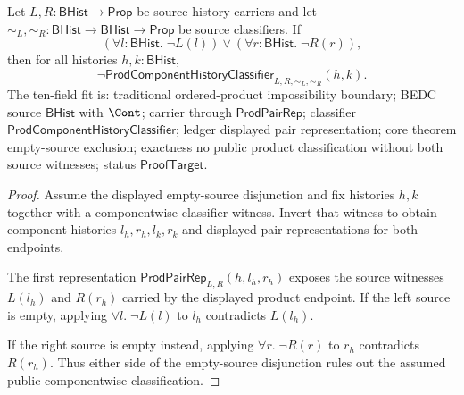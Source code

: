 \begin{theorem}
\label{thm:prod-component-history-classifier-empty-source-exclusion}
Let $L,R:\mathsf{BHist}\to\mathsf{Prop}$ be source-history carriers and let
$\sim_L,\sim_R:\mathsf{BHist}\to\mathsf{BHist}\to\mathsf{Prop}$ be source
classifiers. If
$$
(\forall l:\mathsf{BHist}.\;\neg L(l))
\lor
(\forall r:\mathsf{BHist}.\;\neg R(r)),
$$
then for all histories $h,k:\mathsf{BHist}$,
$$
\neg\mathsf{ProdComponentHistoryClassifier}_{L,R,\sim_L,\sim_R}(h,k).
$$
The ten-field fit is: traditional ordered-product impossibility boundary; BEDC
source $\mathsf{BHist}$ with $\Cont$; carrier through
$\mathsf{ProdPairRep}$; classifier
$\mathsf{ProdComponentHistoryClassifier}$; ledger displayed pair
representation; core theorem empty-source exclusion; exactness no public
product classification without both source witnesses; status
$\mathsf{ProofTarget}$.
\end{theorem}
\begin{proof}
Assume the displayed empty-source disjunction and fix histories $h,k$ together
with a componentwise classifier witness. Invert that witness to obtain
component histories $l_h,r_h,l_k,r_k$ and displayed pair representations for
both endpoints.

The first representation
$\mathsf{ProdPairRep}_{L,R}(h,l_h,r_h)$ exposes the source witnesses
$L(l_h)$ and $R(r_h)$ carried by the displayed product endpoint. If the left
source is empty, applying $\forall l.\;\neg L(l)$ to $l_h$ contradicts
$L(l_h)$.

If the right source is empty instead, applying $\forall r.\;\neg R(r)$ to
$r_h$ contradicts $R(r_h)$. Thus either side of the empty-source disjunction
rules out the assumed public componentwise classification.
\end{proof}

